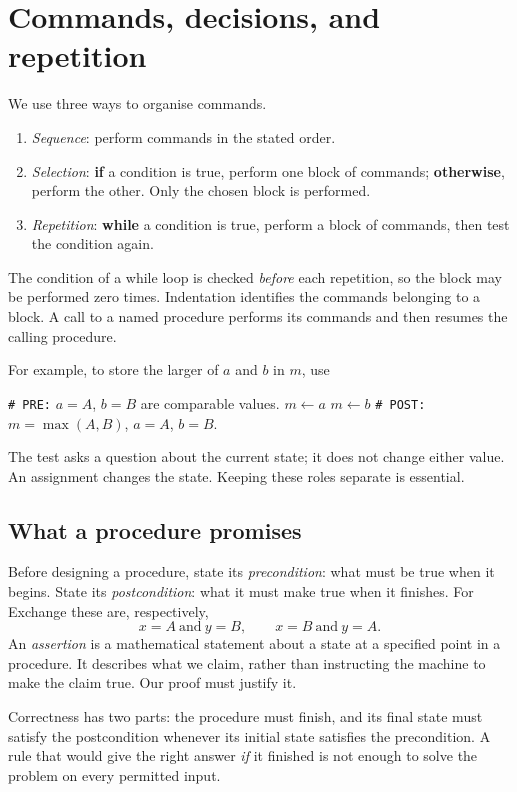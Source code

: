 \section{Commands, decisions, and repetition}

We use three ways to organise commands.
\begin{enumerate}
\item \emph{Sequence}: perform commands in the stated order.
\item \emph{Selection}: \textbf{if} a condition is true, perform one block
of commands; \textbf{otherwise}, perform the other. Only the chosen block
is performed.
\item \emph{Repetition}: \textbf{while} a condition is true, perform a
block of commands, then test the condition again.
\end{enumerate}
The condition of a while loop is checked \emph{before} each repetition,
so the block may be performed zero times. Indentation identifies the
commands belonging to a block. A call to a named procedure performs its
commands and then resumes the calling procedure.

For example, to store the larger of $a$ and $b$ in $m$, use
\begin{algorithmic}[1]
\Statex \texttt{\# PRE:} $a=A$, $b=B$ are comparable values.
\State $m\leftarrow a$
\Else
\State $m\leftarrow b$
\EndIf
\Statex \texttt{\# POST:} $m=\max(A,B)$, $a=A$, $b=B$.
\end{algorithmic}
The test asks a question about the current state; it does not change either
value. An assignment changes the state. Keeping these roles separate is
essential.

\subsection{What a procedure promises}

Before designing a procedure, state its \emph{precondition}: what must be
true when it begins. State its \emph{postcondition}: what it must make
true when it finishes. For Exchange these are, respectively,
\[
x=A\ \text{and}\ y=B,\qquad x=B\ \text{and}\ y=A.
\]
An \emph{assertion} is a mathematical statement about a state at a specified
point in a procedure. It describes what we claim, rather than instructing
the machine to make the claim true. Our proof must justify it.

Correctness has two parts: the procedure must finish, and its final state
must satisfy the postcondition whenever its initial state satisfies the
precondition. A rule that would give the right answer \emph{if} it finished
is not enough to solve the problem on every permitted input.

